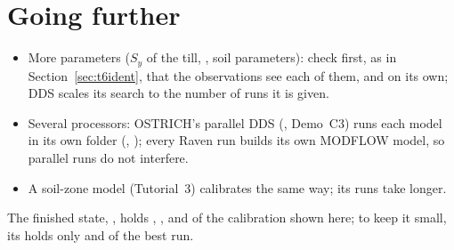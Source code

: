 \section{Going further}
\begin{itemize}
\item More parameters ($S_y$ of the till, , soil parameters): check first, as in Section~\ref{sec:t6ident}, that the
      observations see each of them, and on its own; DDS scales its search to the number of runs it is given.
\item Several processors: OSTRICH's parallel DDS (, Demo~C3) runs each model in its own folder
      (, ); every Raven run builds its own MODFLOW model, so parallel runs do not interfere.
\item A soil-zone model (Tutorial~3) calibrates the same way; its runs take longer.
\end{itemize}
The finished state, , holds , ,  and
 of the calibration shown here; to keep it small, its  holds only  and
 of the best run.
